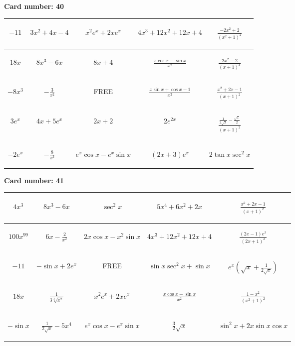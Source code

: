 \documentclass{article}
\newcommand{\entry}[1]{\begin{minipage}[t][2.75cm][t]{4cm} \vspace{1cm} \begin{center}#1\end{center} \end{minipage}}
\newcommand{\freespace}{\entry{FREE}}
\newcommand{\cardnumber}[1]{\noindent \textbf{Card number: #1} \bigskip}
\begin{document}
\pagebreak

\cardnumber{40}
\begin{center}
\begin{tabular}{|*{5}{c|}}
    \hline
    \entry{$-11$} & \entry{$3x^2 + 4x - 4$} & \entry{$x^2 e^x + 2x e^x$} & \entry{$4x^3 + 12x^2 + 12x + 4$} & \entry{$\frac{-2x^2 + 2}{(x^2 + 1)^2}$} \\ \hline
    \entry{$18x$} & \entry{$8x^3 - 6x$} & \entry{$8x + 4$} & \entry{$\frac{x \cos x - \sin x}{x^2}$} & \entry{$\frac{2x^2 - 2}{(x + 1)^4}$} \\ \hline
    \entry{$-8x^3$} & \entry{$-\frac{3}{x^2}$} & \freespace & \entry{$\frac{x \sin x + \cos x - 1}{x^2}$} & \entry{$\frac{x^2 + 2x - 1}{(x + 1)^2}$} \\ \hline
    \entry{$3e^x$} & \entry{$4x + 5e^x$} & \entry{$2x + 2$} & \entry{$2e^{2x}$} & \entry{$\frac{\frac{1}{2 \sqrt{x}} - \frac{\sqrt{x}}{2}}{(x + 1)^2}$} \\ \hline
    \entry{$-2e^x$} & \entry{$-\frac{8}{x^3}$} & \entry{$e^x \cos x - e^x \sin x$} & \entry{$(2x + 3) e^x$} & \entry{$2 \tan x \sec^2 x$} \\ \hline
\end{tabular}
\end{center}

\pagebreak

\cardnumber{41}
\begin{center}
\begin{tabular}{|*{5}{c|}}
    \hline
    \entry{$4x^3$} & \entry{$8x^3 - 6x$} & \entry{$\sec^2 x$} & \entry{$5x^4 + 6x^2 + 2x$} & \entry{$\frac{x^2 + 2x - 1}{(x + 1)^2}$} \\ \hline
    \entry{$100x^{99}$} & \entry{$6x - \frac{2}{x^2}$} & \entry{$2x \cos x - x^2 \sin x$} & \entry{$4x^3 + 12x^2 + 12x + 4$} & \entry{$\frac{(2x - 1) e^x}{(2x + 1)^2}$} \\ \hline
    \entry{$-11$} & \entry{$-\sin x + 2e^x$} & \freespace & \entry{$\sin x \sec^2 x + \sin x$} & \entry{$e^x \left(\sqrt{x} + \frac{1}{2\sqrt{x}}\right)$} \\ \hline
    \entry{$18x$} & \entry{$\frac{1}{3\sqrt[3]{x^2}}$} & \entry{$x^2 e^x + 2x e^x$} & \entry{$\frac{x \cos x - \sin x}{x^2}$} & \entry{$\frac{1 - x^2}{(x^2 + 1)^2}$} \\ \hline
    \entry{$-\sin x$} & \entry{$\frac{1}{2\sqrt{x}} - 5x^4$} & \entry{$e^x \cos x - e^x \sin x$} & \entry{$\frac{3}{2} \sqrt{x}$} & \entry{$\sin^2 x + 2x \sin x \cos x$} \\ \hline
\end{tabular}
\end{center}
\end{document}

